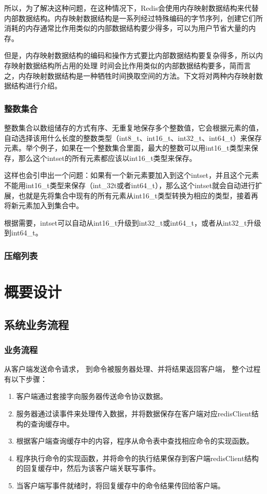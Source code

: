 \documentclass{zjutthesis}
\begin{document}
所以，为了解决这种问题，在这种情况下，Redis会使用内存映射数据结构来代替内部数据结构。内存映射数据结构是一系列经过特殊编码的字节序列，创建它们所消耗的内存通常比作用类似的内部数据结构要少得多，可以为用户节省大量的内存。

但是，内存映射数据结构的编码和操作方式要比内部数据结构要复杂得多，所以内存映射数据结构所占用的处理 时间会比作用类似的内部数据结构要多，简而言之，内存映射数据结构是一种牺牲时间换取空间的方法。下文将对两种内存映射数据结构进行介绍。

\subsection{整数集合}
整数集合以数组储存的方式有序、无重复地保存多个整数值，它会根据元素的值，自动选择该用什么长度的整数类型（int8_t、int16_t、int32_t、int64_t）来保存元素。举个例子，如果在一个整数集合里面，最大的整数可以用int16_t类型来保存，那么这个intset的所有元素都应该以int16_t类型来保存。

这样也会引申出一个问题：如果有一个新元素要加入到这个intset，并且这个元素不能用int16_t类型来保存（int_32t或者int64_t），那么这个intset就会自动进行扩展，也就是先将集合中现有的所有元素从int16_t类型转换为相应的类型，接着再将新元素加入到集合中。

根据需要，intset可以自动从int16_t升级到int32_t或int64_t，或者从int32_t升级到int64_t。
\subsection{压缩列表}



\chapter{概要设计}
\section{系统业务流程}
\subsection{业务流程}
从客户端发送命令请求， 到命令被服务器处理、并将结果返回客户端， 整个过程有以下步骤：
\begin{enumerate}[label=（\arabic*）]
\item{客户端通过套接字向服务器传送命令协议数据。}
\item{服务器通过读事件来处理传入数据，并将数据保存在客户端对应redisClient结构的查询缓存中。}
\item{根据客户端查询缓存中的内容，程序从命令表中查找相应命令的实现函数。}
\item{程序执行命令的实现函数，并将命令的执行结果保存到客户端redisClient结构的回复缓存中，然后为该客户端关联写事件。}
\item{当客户端写事件就绪时，将回复缓存中的命令结果传回给客户端。}
\end{enumerate}
\end{document}
